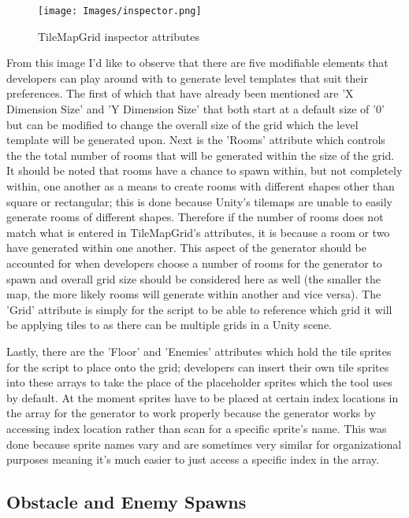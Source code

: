 \documentclass[10pt,twocolumn]{article}
\begin{document}
\begin{figure}[h]
\centering
\texttt{[image: Images/inspector.png]}
\caption{TileMapGrid inspector attributes}
\label{fig:x inspector attributes}
\end{figure}

From this image I'd like to observe that there are five modifiable elements that developers can play around with to generate level templates that suit their preferences. The first of which that have already been mentioned are 'X Dimension Size' and 'Y Dimension Size' that both start at a default size of '0' but can be modified to change the overall size of the grid which the level template will be generated upon. Next is the 'Rooms' attribute which controls the the total number of rooms that will be generated within the size of the grid. It should be noted that rooms have a chance to spawn  within, but not completely within, one another as a means to create rooms with different shapes other than square or rectangular; this is done because Unity's tilemaps are unable to easily generate rooms of different shapes. Therefore if the number of rooms does not match what is entered in TileMapGrid's attributes, it is because a room or two have generated within one another. This aspect of the generator should be accounted for when developers choose a number of rooms for the generator to spawn and overall grid size should be considered here as well (the smaller the map, the more likely rooms will generate within another and vice versa). The 'Grid' attribute is simply for the script to be able to reference which grid it will be applying tiles to as there can be multiple grids in a Unity scene. 

Lastly, there are the 'Floor' and 'Enemies' attributes which hold the tile sprites for the script to place onto the grid; developers can insert their own tile sprites into these arrays to take the place of the placeholder sprites which the tool uses by default. At the moment sprites have to be placed at certain index locations in the array for the generator to work properly because the generator works by accessing index location rather than scan for a specific sprite's name. This was done because sprite names vary and are sometimes very similar for organizational purposes meaning it's much easier to just access a specific index in the array.

\subsection{Obstacle and Enemy Spawns}
\end{document}
